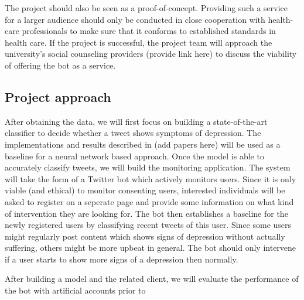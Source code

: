 \documentclass[colorback,accentcolor=tud9c]{tudreport}
\begin{document}
The project should also be seen as a proof-of-concept. Providing such a service for a larger audience should only be conducted in close cooperation with health-care professionals to make sure that it conforms to established standards in health care. If the project is successful, the project team will approach the university's social counseling providers (provide link here) to discuss the viability of offering the bot as a service.

\subsection*{Project approach}

After obtaining the data, we will first focus on building a state-of-the-art classifier to decide whether a tweet shows symptoms of depression. The implementations and results described in (add papers here) will be used as a baseline for a neural network based approach. Once the model is able to accurately classify tweets, we will build the monitoring application. The system will take the form of a Twitter bot which actively monitors users. Since it is only viable (and ethical) to monitor consenting users, interested individuals will be asked to register on a seperate page and provide some information on what kind of intervention they are looking for. The bot then establishes a baseline for the newly registered users by classifying recent tweets of this user. Since some users might regularly post content which shows signs of depression without actually suffering, others might be more upbeat in general. The bot should only intervene if a user starts to show more signs of a depression then normally.

After building a model and the related client, we will evaluate the performance of the bot with artificial accounts prior to 
\end{document}
